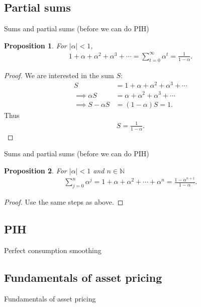 \documentclass[presentation,dvipsnames]{beamer}
\newtheorem{prop}{Proposition}
\begin{document}
\subsection{Partial sums}
\begin{frame}[label=sec-2-3]{Sums and partial sums (before we can do PIH)}
\begin{prop}
\label{prop:2}
For $|\alpha| < 1$,
\begin{align*}
1 + \alpha + \alpha^{2} + \alpha^{3} + \cdots = \sum\limits_{t=0}^{\infty} \alpha^{t} = \frac{1}{1-\alpha}.
\end{align*}
\end{prop}
\begin{proof}
We are interested in the sum $S$:
\begin{align*}
S &= 1 + \alpha + \alpha^{2} + \alpha^{3} + \cdots \\
\implies \alpha S &= \alpha + \alpha^{2} + \alpha^{3} + \cdots \\
\implies S - \alpha S &= (1-\alpha)S = 1.
\end{align*}
Thus
\begin{align*}
S = \frac{1}{1-\alpha}.
\end{align*}
\end{proof}
\end{frame}

\begin{frame}[label=sec-2-3]{Sums and partial sums (before we can do PIH)}
\begin{prop}
\label{prop:2}
For $|\alpha| < 1$ and $n \in \mathbb{N}$
\begin{align*}
\sum\limits_{j=0}^{n} \alpha^{j} = 1+\alpha + \alpha^{2} + \cdots + \alpha^{n} = \frac{1-\alpha^{n+1}}{1-\alpha}.
\end{align*}
\end{prop}
\begin{proof}
Use the same steps as above.
\end{proof}
\end{frame}

\subsection{PIH}
\begin{frame}[label=sec-2-4]{Perfect consumption smoothing}

\end{frame}

\subsection{Fundamentals of asset pricing}
\begin{frame}[label=sec-2-5]{Fundamentals of asset pricing}
\end{frame}
\end{document}
